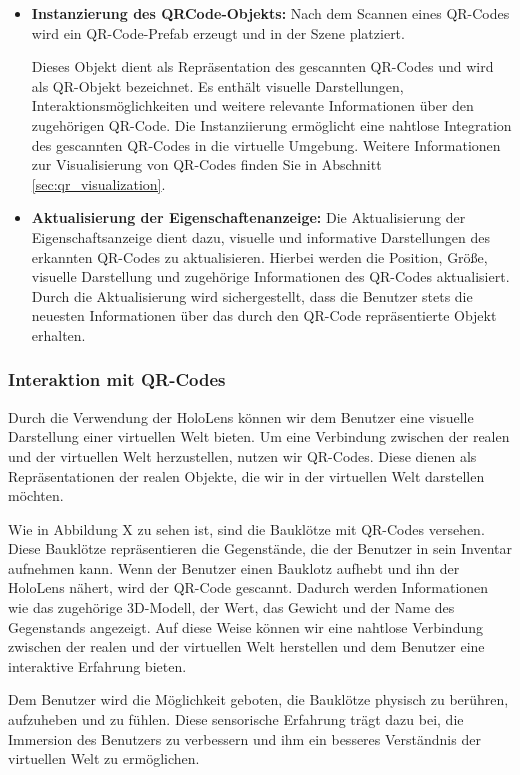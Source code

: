 \begin{itemize}
\item \textbf{Instanzierung des QRCode-Objekts:}
Nach dem Scannen eines QR-Codes wird ein QR-Code-Prefab erzeugt und in der Szene platziert.

Dieses Objekt dient als Repräsentation des gescannten QR-Codes und wird als QR-Objekt bezeichnet. Es enthält visuelle
Darstellungen, Interaktionsmöglichkeiten und weitere relevante Informationen über den zugehörigen QR-Code. Die Instanziierung
ermöglicht eine nahtlose Integration des gescannten QR-Codes in die virtuelle Umgebung. Weitere Informationen zur Visualisierung
von QR-Codes finden Sie in Abschnitt \ref{sec:qr_visualization}.

\item \textbf{Aktualisierung der Eigenschaftenanzeige:}
Die Aktualisierung der Eigenschaftsanzeige dient dazu, visuelle und informative Darstellungen des erkannten QR-Codes zu
aktualisieren. Hierbei werden die Position, Größe, visuelle Darstellung und zugehörige Informationen des QR-Codes aktualisiert.
Durch die Aktualisierung wird sichergestellt, dass die Benutzer stets die neuesten Informationen über das durch den QR-Code
repräsentierte Objekt erhalten.

\end{itemize}

\subsubsection{Interaktion mit QR-Codes}
Durch die Verwendung der HoloLens können wir dem Benutzer eine visuelle Darstellung einer virtuellen Welt bieten. Um eine
Verbindung zwischen der realen und der virtuellen Welt herzustellen, nutzen wir QR-Codes.  Diese dienen als Repräsentationen
der realen Objekte, die wir in der virtuellen Welt darstellen möchten.

Wie in Abbildung X zu sehen ist, sind die Bauklötze mit QR-Codes versehen. Diese Bauklötze repräsentieren die Gegenstände,
die der Benutzer in sein Inventar aufnehmen kann. Wenn der Benutzer einen Bauklotz aufhebt und ihn der HoloLens nähert, wird
der QR-Code gescannt. Dadurch werden Informationen wie das zugehörige 3D-Modell, der Wert, das Gewicht und der Name des
Gegenstands angezeigt. Auf diese Weise können wir eine nahtlose Verbindung zwischen der realen und der virtuellen Welt
herstellen und dem Benutzer eine interaktive Erfahrung bieten. %

Dem Benutzer wird die Möglichkeit geboten, die Bauklötze physisch zu berühren, aufzuheben und zu fühlen. Diese sensorische
Erfahrung trägt dazu bei, die Immersion des Benutzers zu verbessern und ihm ein besseres Verständnis der virtuellen Welt
zu ermöglichen.

